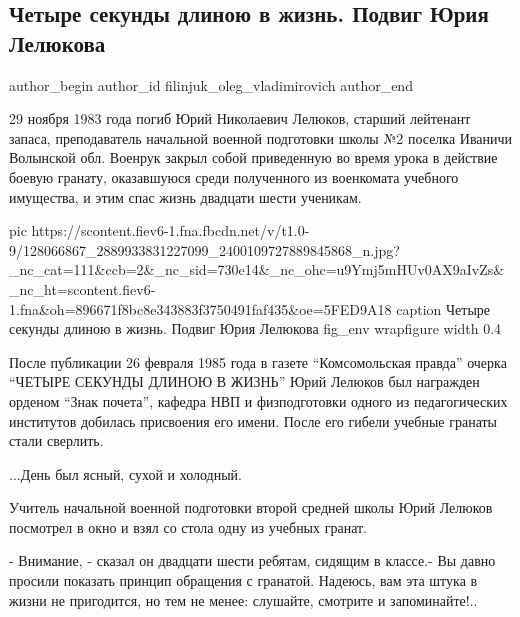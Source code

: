  
 
 
 
 
 
\subsection{Четыре секунды длиною в жизнь. Подвиг Юрия Лелюкова}
\label{sec:29_11_2020.fb.filinjuk_oleg_vladimirovich.1.podvig_jurija_lelukova}
\ifcmt
	author_begin
   author_id filinjuk_oleg_vladimirovich
	author_end
\fi

29 ноября 1983 года погиб Юрий Николаевич Лелюков, старший лейтенант запаса,
преподаватель начальной военной подготовки школы №2 поселка Иваничи Волынской
обл. Военрук закрыл собой приведенную во время урока в действие боевую гранату,
оказавшуюся среди полученного из военкомата учебного имущества, и этим спас
жизнь двадцати шести ученикам.

\ifcmt
pic https://scontent.fiev6-1.fna.fbcdn.net/v/t1.0-9/128066867_2889933831227099_2400109727889845868_n.jpg?_nc_cat=111&ccb=2&_nc_sid=730e14&_nc_ohc=u9Ymj5mHUv0AX9aIvZs&_nc_ht=scontent.fiev6-1.fna&oh=896671f8bc8e343883f3750491faf435&oe=5FED9A18
caption Четыре секунды длиною в жизнь. Подвиг Юрия Лелюкова
fig_env wrapfigure
width 0.4
\fi

После публикации 26 февраля 1985 года в газете \enquote{Комсомольская правда} очерка
\enquote{ЧЕТЫРЕ СЕКУНДЫ ДЛИНОЮ В ЖИЗНЬ} Юрий Лелюков был награжден орденом \enquote{Знак почета}, 
кафедра НВП и физподготовки одного из педагогических институтов
добилась присвоения его имени. После его гибели учебные гранаты стали сверлить.

...День был ясный, сухой и холодный.

Учитель начальной военной подготовки второй средней школы Юрий Лелюков
посмотрел в окно и взял со стола одну из учебных гранат.

- Внимание, - сказал он двадцати шести ребятам, сидящим в классе.- Вы давно
просили показать принцип обращения с гранатой. Надеюсь, вам эта штука в жизни
не пригодится, но тем не менее: слушайте, смотрите и запоминайте!..

